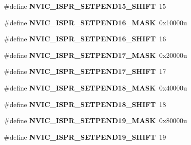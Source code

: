 \begin{DoxyCompactItemize}
\#define {\bfseries N\+V\+I\+C\+\_\+\+I\+S\+P\+R\+\_\+\+S\+E\+T\+P\+E\+N\+D15\+\_\+\+S\+H\+I\+FT}~15
\item 
\mbox{\label{group___n_v_i_c___register___masks_ga32cc62a5ffdc8cb071b431b9a6d010a7}} 
\#define {\bfseries N\+V\+I\+C\+\_\+\+I\+S\+P\+R\+\_\+\+S\+E\+T\+P\+E\+N\+D16\+\_\+\+M\+A\+SK}~0x10000u
\item 
\mbox{\label{group___n_v_i_c___register___masks_ga9c4d942935688b7a8b877f661ceea3f4}} 
\#define {\bfseries N\+V\+I\+C\+\_\+\+I\+S\+P\+R\+\_\+\+S\+E\+T\+P\+E\+N\+D16\+\_\+\+S\+H\+I\+FT}~16
\item 
\mbox{\label{group___n_v_i_c___register___masks_ga26e79f495baa012fcc56361f77367ab6}} 
\#define {\bfseries N\+V\+I\+C\+\_\+\+I\+S\+P\+R\+\_\+\+S\+E\+T\+P\+E\+N\+D17\+\_\+\+M\+A\+SK}~0x20000u
\item 
\mbox{\label{group___n_v_i_c___register___masks_gae328591548530e5190483af66623fdb3}} 
\#define {\bfseries N\+V\+I\+C\+\_\+\+I\+S\+P\+R\+\_\+\+S\+E\+T\+P\+E\+N\+D17\+\_\+\+S\+H\+I\+FT}~17
\item 
\mbox{\label{group___n_v_i_c___register___masks_gabf2dc860a6cc09ba0f85a78cc8ea78de}} 
\#define {\bfseries N\+V\+I\+C\+\_\+\+I\+S\+P\+R\+\_\+\+S\+E\+T\+P\+E\+N\+D18\+\_\+\+M\+A\+SK}~0x40000u
\item 
\mbox{\label{group___n_v_i_c___register___masks_gabc9d1b04dd349562936c1d72bd78b155}} 
\#define {\bfseries N\+V\+I\+C\+\_\+\+I\+S\+P\+R\+\_\+\+S\+E\+T\+P\+E\+N\+D18\+\_\+\+S\+H\+I\+FT}~18
\item 
\mbox{\label{group___n_v_i_c___register___masks_ga2a463208e88c875664a5b82164671708}} 
\#define {\bfseries N\+V\+I\+C\+\_\+\+I\+S\+P\+R\+\_\+\+S\+E\+T\+P\+E\+N\+D19\+\_\+\+M\+A\+SK}~0x80000u
\item 
\mbox{\label{group___n_v_i_c___register___masks_ga7add9b5bbebb525ba14a5b34bf72be21}} 
\#define {\bfseries N\+V\+I\+C\+\_\+\+I\+S\+P\+R\+\_\+\+S\+E\+T\+P\+E\+N\+D19\+\_\+\+S\+H\+I\+FT}~19

\end{DoxyCompactItemize}
